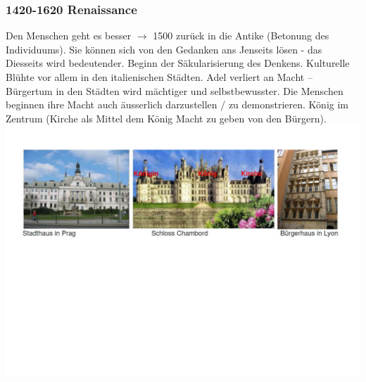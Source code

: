\documentclass[10pt, openright=true]{scrartcl}
\begin{document}
\subsubsection{1420-1620 Renaissance}
Den Menschen geht es besser $ \rightarrow $ 1500 zurück in die Antike (Betonung des Individuums). Sie können sich von den Gedanken ans Jenseits lösen - das Diesseits wird bedeutender. Beginn der Säkularisierung des Denkens. Kulturelle Blühte vor allem in den italienischen Städten. Adel verliert an Macht – Bürgertum in den Städten wird mächtiger und selbstbewusster. Die Menschen beginnen ihre Macht auch äusserlich darzustellen / zu demonstrieren. König im Zentrum (Kirche als Mittel dem König Macht zu geben von den Bürgern). \\
\includegraphics[width=1\textwidth]{images/rennaissance}
\end{document}
